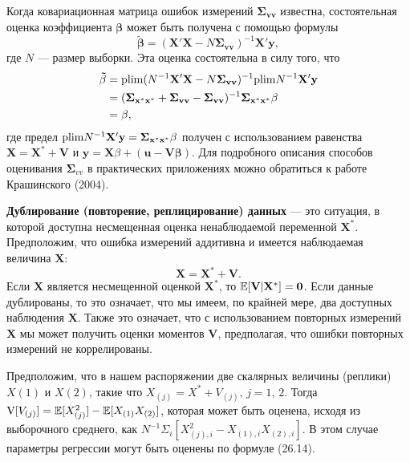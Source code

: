Когда ковариационная матрица ошибок измерений $\mathbf{\Sigma_{vv}}$ известна, состоятельная оценка коэффициента $\mathbf{\beta}$ может быть получена с помощью формулы
\begin{equation}
\mathbf{\tilde{\beta}}=(\mathbf{X'X}-N \mathbf{\Sigma_{vv}})^{-1} \mathbf{X'y},
\end{equation}
где $N$ –-- размер выборки. Эта оценка состоятельна в силу того, что
\begin{align*}
\mathbf{\tilde{\beta}}&=\mathrm{plim }(N^{-1}\mathbf{X'X}-N \mathbf{\Sigma_{vv}})^{-1} \mathrm{plim } N^{-1} \mathbf{X'y}  \\
&= (\mathbf{\Sigma_{x^*x^*}} + \mathbf{\Sigma_{vv}} - \mathbf{\Sigma_{vv}})^{-1} \mathbf{\Sigma_{x^*x^*} \beta} \\
&= \mathbf{\beta},
\end{align*}
где предел $\mathrm{plim } N^{-1} \mathbf{X'y}=\mathbf{\Sigma_{x^*x^*} \beta}$ получен с использованием равенства $\mathbf{X}=\mathbf{X^*}+\mathbf{V}$ и $\mathbf{y}=\mathbf{X} \beta + (\mathbf{u}-\mathbf{V \beta})$. Для подробного описания способов оценивания $\mathbf{\Sigma}_{vv}$ в практических приложениях можно обратиться к работе Крашинского (2004).

{\bf Дублирование (повторение, реплицирование) данных} –-- это ситуация, в которой доступна несмещенная оценка ненаблюдаемой переменной $\mathbf{X^*}$. Предположим, что ошибка измерений аддитивна и имеется наблюдаемая величина $\mathbf{X}$:
\[
\mathbf{X}=\mathbf{X^*}+\mathbf{V}.
\]
Если $\mathbf{X}$ является несмещенной оценкой $\mathbf{X^*}$, то $\mathbb{E}[\mathbf{V|X^*}]=\mathbf{0}$. Если данные дублированы, то это означает, что мы имеем, по крайней мере, два доступных наблюдения $\mathbf{X}$. Также это означает, что с использованием повторных измерений $\mathbf{X}$ мы может получить оценки моментов $\mathbf{V}$, предполагая, что ошибки повторных измерений  не коррелированы.

Предположим, что в нашем распоряжении две скалярных величины (реплики) $X(1)$ и $X(2)$, такие что $X_{(j)}=X^*+V_{(j)}, \, j=1, \, 2$. Тогда $\mathrm{V}[V_{(j)}]=\mathbb{E}[X^2_{(j)}]-\mathbb{E}[X_{(1)}X_{(2)}]$, которая может быть оценена, исходя из выборочного среднего, как $N^{-1} \Sigma_i [X^2_{(j),i}-X_{(1),i}X_{(2),i}]$. В этом случае параметры регрессии могут быть оценены  по формуле (26.14). 

